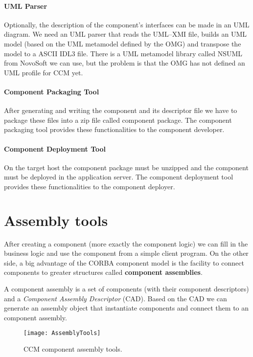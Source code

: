 \paragraph{UML Parser}

Optionally, the description of the component's interfaces can be made in an UML
diagram. We need an UML parser that reads the UML--XMI file, builds an UML model
(based on the UML metamodel defined by the OMG) and transpose the model to a
ASCII IDL3 file. There is a UML metamodel library called NSUML from NovoSoft we
can use, but the problem is that the OMG has not defined an UML profile for CCM
yet.

\paragraph{Component Packaging Tool}

After generating and writing the component and its descriptor file we have to
package these files into a zip file called component package. The component
packaging tool provides these functionalities to the component developer.

\paragraph{Component Deployment Tool}

On the target host the component package must be unzipped and the component must
be deployed in the application server. The component deployment tool provides
these functionalities to the component deployer.

\section{Assembly tools}

After creating a component (more exactly the component logic) we can fill in the
business logic and use the component from a simple client program. On the other
side, a big advantage of the CORBA component model is the facility to connect
components to greater structures called {\bf component assemblies}.

A component assembly is a set of components (with their component descriptors)
and a {\it Component Assembly Descriptor} (CAD). Based on the CAD we can
generate an assembly object that instantiate components and connect them to an
component assembly.

\begin{figure}
\texttt{[image: AssemblyTools]}
\caption{CCM component assembly tools.}
\label{fig:intro-AssemblyTools}
\end{figure}

